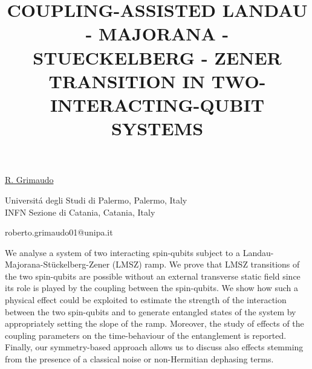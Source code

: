 \title{COUPLING-ASSISTED LANDAU - MAJORANA - STUECKELBERG - ZENER TRANSITION IN TWO-INTERACTING-QUBIT SYSTEMS}

\underline{R. Grimaudo}  

{\normalsize{\vspace{-4mm}
Universit\'a degli Studi di Palermo, Palermo, Italy\\
INFN Sezione di Catania, Catania, Italy



\email roberto.grimaudo01@unipa.it}}

We analyse a system of two interacting spin-qubits subject to a Landau-Majorana-St\"uckelberg-Zener (LMSZ) ramp. We prove that LMSZ transitions of the two spin-qubits are possible without an external transverse static field since its role is played by the coupling between the spin-qubits. We show how such a physical effect could be exploited to estimate the strength of the interaction between the two spin-qubits and to generate entangled states of the system by appropriately setting the slope of the ramp. Moreover, the study of effects of the coupling parameters on the time-behaviour of the entanglement is reported. Finally, our symmetry-based approach allows us to discuss also effects stemming from the presence of a classical noise or non-Hermitian dephasing terms.

\vspace{\baselineskip}